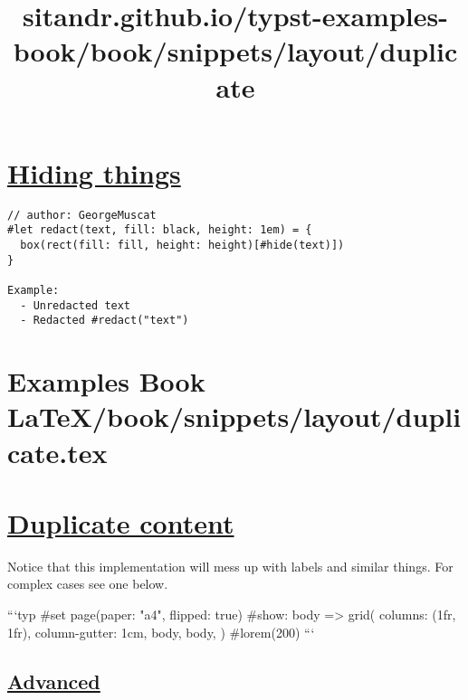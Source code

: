 \section{\texorpdfstring{\hyperref[hiding-things]{Hiding
things}}{Hiding things}}\label{hiding-things}

\begin{verbatim}
// author: GeorgeMuscat
#let redact(text, fill: black, height: 1em) = {
  box(rect(fill: fill, height: height)[#hide(text)])
}

Example:
  - Unredacted text
  - Redacted #redact("text")
\end{verbatim}

\pandocbounded{}


\section{Examples Book LaTeX/book/snippets/layout/duplicate.tex}
\title{sitandr.github.io/typst-examples-book/book/snippets/layout/duplicate}

\section{\texorpdfstring{\hyperref[duplicate-content]{Duplicate
content}}{Duplicate content}}\label{duplicate-content}

Notice that this implementation will mess up with labels and similar
things. For complex cases see one below.

```typ \#set page(paper: "a4", flipped: true) \#show: body
=\textgreater{} grid( columns: (1fr, 1fr), column-gutter: 1cm, body,
body, ) \#lorem(200) ```

\subsection{\texorpdfstring{\hyperref[advanced]{Advanced}}{Advanced}}\label{advanced}

